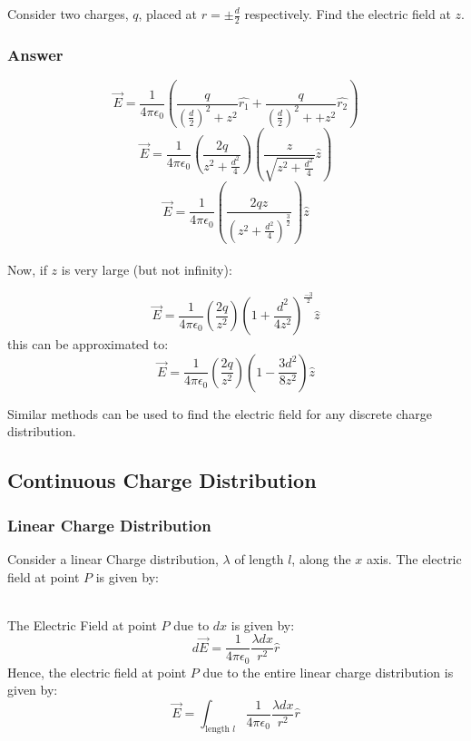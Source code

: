 \documentclass{article}
\begin{document}
Consider two charges, $q$, placed at $r = \pm \frac{d}{2}$ respectively. Find the electric field at $z$.

\subsubsection*{Answer}
\[\vec{E} = \frac{1}{4\pi\epsilon_0} \left( \frac{q}{\left(\frac{d}{2}\right)^2 + z^2} \hat{r_1} + \frac{q}{\left(\frac{d}{2}\right)^2 + + z^2} \hat{r_2} \right)\]
\[\vec{E} = \frac{1}{4\pi\epsilon_0} \left( \frac{2q}{z^2 + \frac{d^2}{4}}\right) \left(\frac{z}{\sqrt{z^2 + \frac{d^2}{4}}}\hat{z}\right)\]
\[\vec{E} = \frac{1}{4\pi\epsilon_0} \left( \frac{2qz}{\left(z^2 + \frac{d^2}{4}\right)^{\frac{3}{2}}}\right) \hat{z}\]
\\
Now, if $z$ is very large (but not infinity):

\[\vec{E} = \frac{1}{4\pi\epsilon_0} \left( \frac{2q}{z^2}\right)\left(1 + \frac{d^2}{4z^2}\right)^{\frac{-3}{2}} \hat{z}\]
this can be approximated to:
\[\vec{E} = \frac{1}{4\pi\epsilon_0} \left( \frac{2q}{z^2}\right)\left(1 - \frac{3d^2}{8z^2}\right) \hat{z}\]

Similar methods can be used to find the electric field for any discrete charge distribution.

\subsection{Continuous Charge Distribution}
\subsubsection{Linear Charge Distribution}
Consider a linear Charge distribution, $\lambda$ of length $l$, along the $x$ axis. The electric field at point $P$ is given by: \\
\\
The Electric Field at point $P$ due to $dx$ is given by:
\[d\vec{E} = \frac{1}{4\pi \epsilon_0} \frac{\lambda dx}{r^2} \hat{r}  \]
Hence, the electric field at point $P$ due to the entire linear charge distribution is given by:
\[\vec{E} = \int_{\text{length $l$}} \frac{1}{4\pi \epsilon_0} \frac{\lambda dx}{r^2} \hat{r} \]
\end{document}
